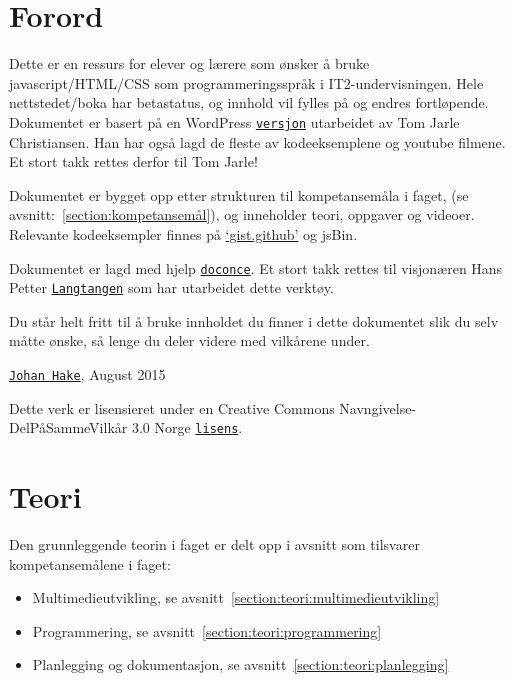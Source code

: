 \documentclass[%
oneside,                 %
final,                   %
12pt]{article}
\begin{document}
\pagebreak

\section{Forord}
\label{section:forord}

Dette er en ressurs for elever og lærere som ønsker å bruke
javascript/HTML/CSS som programmeringsspråk i IT2-undervisningen. Hele
nettstedet/boka har betastatus, og innhold vil fylles på og endres
fortløpende. Dokumentet er basert på en WordPress
\href{{http://www.fuzzbin.org/IT2}}{\nolinkurl{versjon}} utarbeidet av Tom Jarle
Christiansen. Han har også lagd de fleste av kodeeksemplene og youtube
filmene. Et stort takk rettes derfor til Tom Jarle!

Dokumentet er bygget opp etter strukturen til kompetansemåla i faget,
(se avsnitt:~\ref{section:kompetansemål}), og inneholder teori,
oppgaver og videoer. Relevante kodeeksempler finnes på
\href{{http://gist.github.com/johanhake}}{`gist.github'} og jsBin.

Dokumentet er lagd med hjelp
\href{{http://hplgit.github.io/doconce/doc/web/index.html}}{\nolinkurl{doconce}}.  Et
stort takk rettes til visjonæren Hans Petter
\href{{http://hplgit.github.io/homepage/index.html}}{\nolinkurl{Langtangen}} som har
utarbeidet dette verktøy.


Du står helt fritt til å bruke innholdet du finner i dette dokumentet
slik du selv måtte ønske, så lenge du deler videre med vilkårene
under. 

\href{{mailto:johan.hake@gmail.com}}{\nolinkurl{Johan Hake}}, August 2015

Dette verk er lisensieret under en Creative Commons
Navngivelse-DelPåSammeVilkår 3.0 Norge
\href{{http://creativecommons.org/licenses/by-sa/3.0/no/}}{\nolinkurl{lisens}}.


\pagebreak

\section{Teori}

Den grunnleggende teorin i faget er delt opp i avsnitt som tilsvarer
kompetansemålene i faget:

\begin{itemize}
\item Multimedieutvikling, se avsnitt~\ref{section:teori:multimedieutvikling}

\item Programmering, se avsnitt~\ref{section:teori:programmering}

\item Planlegging og dokumentasjon, se avsnitt~\ref{section:teori:planlegging}
\end{itemize}
\end{document}
